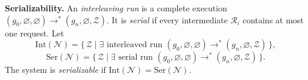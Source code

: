 \smallskip
\noindent
\textbf{Serializability.}
An \emph{interleaving run} is a complete execution $(g_0,\varnothing,\varnothing)\rightarrow^{*}(g_n,\varnothing,\mathcal{Z})$.
It is \emph{serial} if every intermediate $\mathcal{R}_i$ contains at most one request. Let
\[
\mathrm{Int}(\mathcal{N})=\{\,\mathcal{Z}\mid \exists\text{ interleaved run }(g_0,\varnothing,\varnothing)\rightarrow^{*}(g_n,\varnothing,\mathcal{Z})\,\},
\]
\[
\mathrm{Ser}(\mathcal{N})=\{\,\mathcal{Z}\mid \exists\text{ serial run }(g_0,\varnothing,\varnothing)\rightarrow^{*}(g_n,\varnothing,\mathcal{Z})\,\}.
\]
The system is \emph{serializable} if $\mathrm{Int}(\mathcal{N})=\mathrm{Ser}(\mathcal{N})$.


%
%
%
%
%
%

